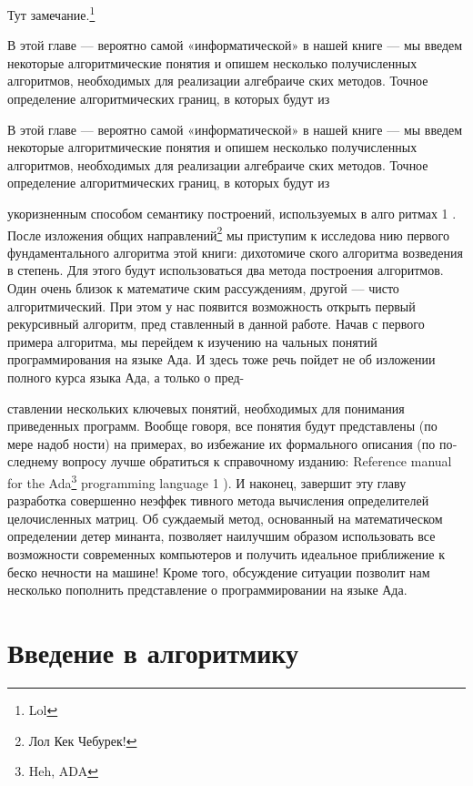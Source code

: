 \documentclass{mai_book}
\begin{document}
\begin{mynotice}
Тут замечание.\footnote{Lol}
\end{mynotice}
В этой главе — вероятно самой «информатической» в нашей книге —
мы введем некоторые алгоритмические понятия и опишем несколько
получисленных алгоритмов, необходимых для реализации алгебраиче­
ских методов.
Точное определение алгоритмических границ, в которых будут из­
\begin{determ}
В этой главе — вероятно самой «информатической» в нашей книге —
мы введем некоторые алгоритмические понятия и опишем несколько
\hspace*{7pt} получисленных алгоритмов, необходимых для реализации алгебраиче­
ских методов.
Точное определение алгоритмических границ, в которых будут из­
\end{determ}
укоризненным способом семантику построений, используемых в алго­
ритмах 1 .
После изложения общих направлений\footnote{Лол Кек Чебурек!} мы приступим к исследова­
нию первого фундаментального алгоритма этой книги: дихотомиче­
ского алгоритма возведения в степень. Для этого будут использоваться
два метода построения алгоритмов. Один очень близок к математиче­
ским рассуждениям, другой — чисто алгоритмический. При этом у нас
появится возможность открыть первый рекурсивный алгоритм, пред­
ставленный в данной работе.
Начав с первого примера алгоритма, мы перейдем к изучению на­
чальных понятий программирования на языке Ада. И здесь тоже речь
пойдет не об изложении полного курса языка Ада, а только о пред-

\pagebreak
ставлении нескольких ключевых понятий, необходимых для понимания
приведенных программ.
Вообще говоря, все понятия будут представлены (по мере надоб­
ности) на примерах, во избежание их формального описания (по по­
следнему вопросу лучше обратиться к справочному изданию: Reference
manual for the Ada\footnote{Heh, ADA} programming language 1 ).
И наконец, завершит эту главу разработка совершенно неэффек­
тивного метода вычисления определителей целочисленных матриц. Об­
суждаемый метод, основанный на математическом определении детер­
минанта, позволяет наилучшим образом использовать все возможности
современных компьютеров и получить идеальное приближение к беско­
нечности на машине! Кроме того, обсуждение ситуации позволит нам
несколько пополнить представление о программировании на языке Ада.

\section{Введение в алгоритмику}
\end{document}
